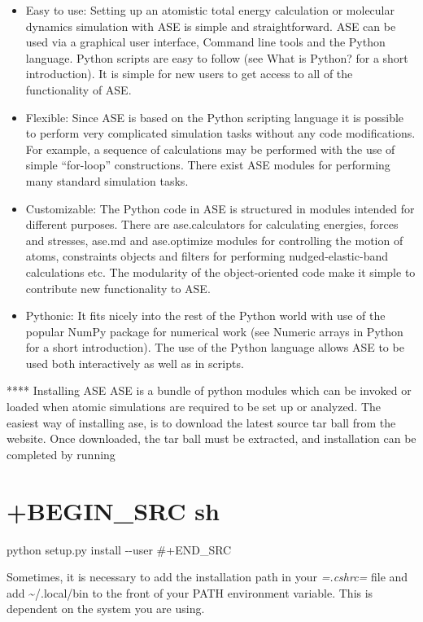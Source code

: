 \documentclass[11pt]{article}
\begin{document}
\begin{itemize}
\item
  Easy to use: Setting up an atomistic total energy calculation or
  molecular dynamics simulation with ASE is simple and straightforward.
  ASE can be used via a graphical user interface, Command line tools and
  the Python language. Python scripts are easy to follow (see What is
  Python? for a short introduction). It is simple for new users to get
  access to all of the functionality of ASE.
\item
  Flexible: Since ASE is based on the Python scripting language it is
  possible to perform very complicated simulation tasks without any code
  modifications. For example, a sequence of calculations may be
  performed with the use of simple ``for-loop'' constructions. There
  exist ASE modules for performing many standard simulation tasks.
\item
  Customizable: The Python code in ASE is structured in modules intended
  for different purposes. There are ase.calculators for calculating
  energies, forces and stresses, ase.md and ase.optimize modules for
  controlling the motion of atoms, constraints objects and filters for
  performing nudged-elastic-band calculations etc. The modularity of the
  object-oriented code make it simple to contribute new functionality to
  ASE.
\item
  Pythonic: It fits nicely into the rest of the Python world with use of
  the popular NumPy package for numerical work (see Numeric arrays in
  Python for a short introduction). The use of the Python language
  allows ASE to be used both interactively as well as in scripts.
\end{itemize}

**** Installing ASE ASE is a bundle of python modules which can be
invoked or loaded when atomic simulations are required to be set up or
analyzed. The easiest way of installing ase, is to download the latest
source tar ball from the website. Once downloaded, the tar ball must be
extracted, and installation can be completed by running

\section{+BEGIN\_SRC sh}\label{begin_src-sh-1}

python setup.py install -\/-user \#+END\_SRC

Sometimes, it is necessary to add the installation path in your
\emph{=.cshrc=} file and add \textasciitilde{}/.local/bin to the front
of your PATH environment variable. This is dependent on the system you
are using.
\end{document}
